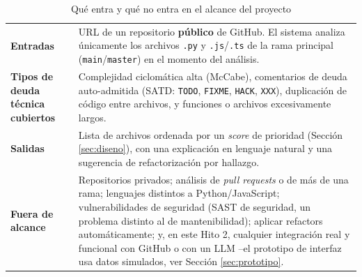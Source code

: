 \begin{table}[H]
\centering
\caption{Qué entra y qué no entra en el alcance del proyecto}
\label{tab:alcance}
\begin{tabular}{p{} p{}}
\toprule
\textbf{Entradas} & URL de un repositorio \textbf{público} de GitHub. El sistema analiza únicamente los archivos \texttt{.py} y \texttt{.js}/\texttt{.ts} de la rama principal (\texttt{main}/\texttt{master}) en el momento del análisis. \\[4pt]
\textbf{Tipos de deuda técnica cubiertos} & Complejidad ciclomática alta (McCabe), comentarios de deuda auto-admitida (SATD: \texttt{TODO}, \texttt{FIXME}, \texttt{HACK}, \texttt{XXX}), duplicación de código entre archivos, y funciones o archivos excesivamente largos. \\[4pt]
\textbf{Salidas} & Lista de archivos ordenada por un \textit{score} de prioridad (Sección \ref{sec:diseno}), con una explicación en lenguaje natural y una sugerencia de refactorización por hallazgo. \\[4pt]
\textbf{Fuera de alcance} & Repositorios privados; análisis de \textit{pull requests} o de más de una rama; lenguajes distintos a Python/JavaScript; vulnerabilidades de seguridad (SAST de seguridad, un problema distinto al de mantenibilidad); aplicar refactors automáticamente; y, en este Hito 2, cualquier integración real y funcional con GitHub o con un LLM --el prototipo de interfaz usa datos simulados, ver Sección \ref{sec:prototipo}. \\
\bottomrule
\end{tabular}
\end{table}

\pagebreak
